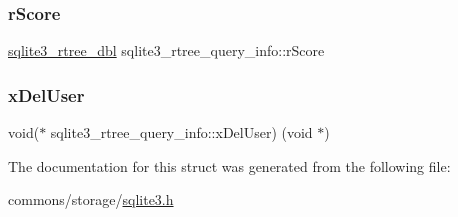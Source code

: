 \mbox{\label{structsqlite3__rtree__query__info_af449e4a3607573d17b3d31c67b6e1584}} 
\subsubsection{\texorpdfstring{rScore}{rScore}}
{\footnotesize\ttfamily \mbox{\hyperlink{sqlite3_8h_ae9156ff58620c1ceae9391f1afabae1b}{sqlite3\+\_\+rtree\+\_\+dbl}} sqlite3\+\_\+rtree\+\_\+query\+\_\+info\+::r\+Score}

\mbox{\label{structsqlite3__rtree__query__info_a23bcc6df883995d42d65449a27f45f85}} 
\subsubsection{\texorpdfstring{xDelUser}{xDelUser}}
{\footnotesize\ttfamily void($\ast$ sqlite3\+\_\+rtree\+\_\+query\+\_\+info\+::x\+Del\+User) (void $\ast$)}



The documentation for this struct was generated from the following file\+:\begin{DoxyCompactItemize}
\item 
commons/storage/\mbox{\hyperlink{sqlite3_8h}{sqlite3.\+h}}\end{DoxyCompactItemize}
